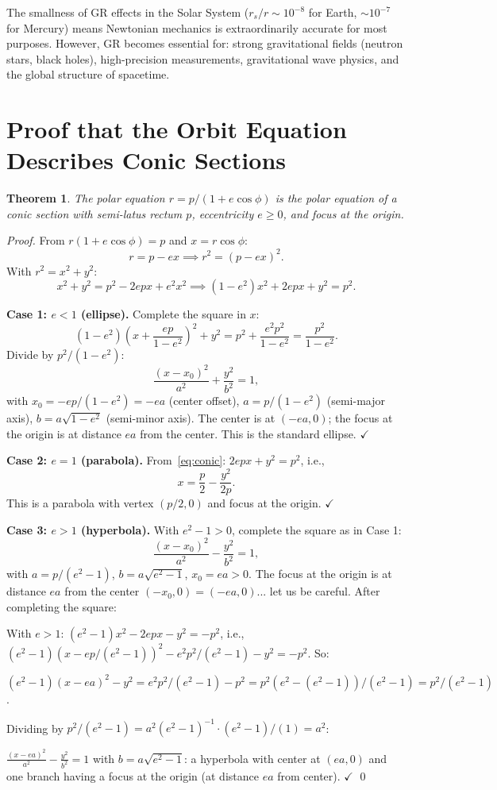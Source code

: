 \documentclass[12pt,a4paper]{article}
\theoremstyle{plain}
\newtheorem{theorem}{Theorem}[section]
\theoremstyle{definition}
\theoremstyle{remark}
\begin{document}
The smallness of GR effects in the Solar System ($r_s/r\sim10^{-8}$ for Earth, $\sim10^{-7}$ for Mercury) means Newtonian mechanics is extraordinarily accurate for most purposes. However, GR becomes essential for: strong gravitational fields (neutron stars, black holes), high-precision measurements, gravitational wave physics, and the global structure of spacetime.

\appendix

\section{Proof that the Orbit Equation Describes Conic Sections}\label{app:conic}

\begin{theorem}
The polar equation $r = p/(1+e\cos\phi)$ is the polar equation of a conic section with semi-latus rectum $p$, eccentricity $e\geq0$, and focus at the origin.
\end{theorem}
\begin{proof}
From $r(1+e\cos\phi)=p$ and $x=r\cos\phi$:
\[
  r = p-ex \implies r^2=(p-ex)^2.
\]
With $r^2=x^2+y^2$:
\[
  x^2+y^2 = p^2-2epx+e^2x^2
  \implies
  (1-e^2)x^2 + 2epx + y^2 = p^2. \tag{A.1}\label{eq:conic}
\]

\textbf{Case 1: $e<1$ (ellipse).} Complete the square in $x$:
\[
  (1-e^2)\!\left(x+\frac{ep}{1-e^2}\right)^2 + y^2
  = p^2 + \frac{e^2p^2}{1-e^2}
  = \frac{p^2}{1-e^2}.
\]
Divide by $p^2/(1-e^2)$:
\[
  \frac{(x-x_0)^2}{a^2}+\frac{y^2}{b^2}=1,
\]
with $x_0=-ep/(1-e^2)=-ea$ (center offset), $a=p/(1-e^2)$ (semi-major axis), $b=a\sqrt{1-e^2}$ (semi-minor axis). The center is at $(-ea,0)$; the focus at the origin is at distance $ea$ from the center. This is the standard ellipse. $\checkmark$

\textbf{Case 2: $e=1$ (parabola).} From~\eqref{eq:conic}: $2epx+y^2=p^2$, i.e.,
\[
  x = \frac{p}{2} - \frac{y^2}{2p}.
\]
This is a parabola with vertex $(p/2,0)$ and focus at the origin. $\checkmark$

\textbf{Case 3: $e>1$ (hyperbola).} With $e^2-1>0$, complete the square as in Case 1:
\[
  \frac{(x-x_0)^2}{a^2} - \frac{y^2}{b^2} = 1,
\]
with $a=p/(e^2-1)$, $b=a\sqrt{e^2-1}$, $x_0=ea>0$. The focus at the origin is at distance $ea$ from the center $(-x_0,0)=(-ea,0)$... let us be careful. After completing the square:

With $e>1$: $(e^2-1)x^2-2epx-y^2=-p^2$, i.e., $(e^2-1)(x-ep/(e^2-1))^2 - e^2p^2/(e^2-1)-y^2=-p^2$. So:

$(e^2-1)(x-ea)^2-y^2 = e^2p^2/(e^2-1)-p^2 = p^2(e^2-(e^2-1))/(e^2-1)=p^2/(e^2-1)$.

Dividing by $p^2/(e^2-1)=a^2(e^2-1)^{-1}\cdot(e^2-1)/(1) = a^2$:

$\frac{(x-ea)^2}{a^2}-\frac{y^2}{b^2}=1$ with $b=a\sqrt{e^2-1}$: a hyperbola with center at $(ea,0)$ and one branch having a focus at the origin (at distance $ea$ from center). $\checkmark$ \qed
\end{proof}
\end{document}
